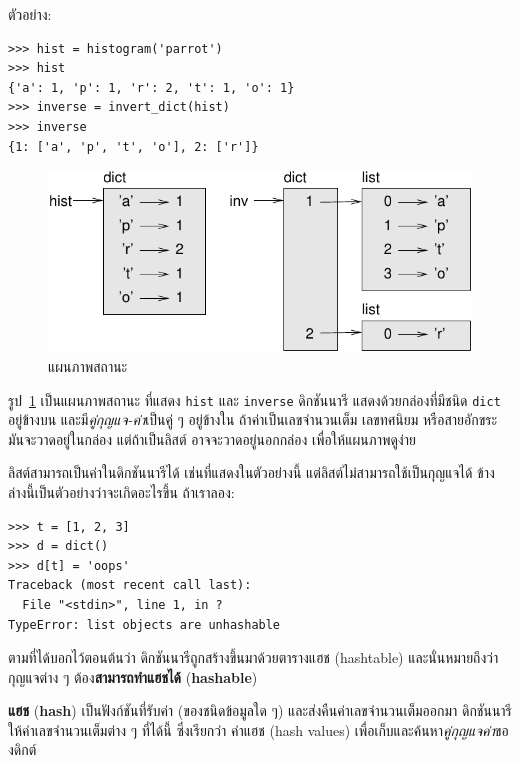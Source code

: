 ตัวอย่าง:

\begin{verbatim}
>>> hist = histogram('parrot')
>>> hist
{'a': 1, 'p': 1, 'r': 2, 't': 1, 'o': 1}
>>> inverse = invert_dict(hist)
>>> inverse
{1: ['a', 'p', 't', 'o'], 2: ['r']}
\end{verbatim}

\begin{figure}
\centerline
{\includegraphics[scale=0.8]{figs/dict1.pdf}}
\caption{แผนภาพสถานะ}
\label{fig.dict1}
\end{figure}

รูป~\ref{fig.dict1} เป็นแผนภาพสถานะ ที่แสดง \texttt{hist} และ \texttt{inverse}
%
ดิกชันนารี แสดงด้วยกล่องที่มีชนิด \texttt{dict} อยู่ข้างบน
และมี\textit{คู่กุญแจ-ค่า}เป็นคู่ ๆ อยู่ข้างใน
ถ้าค่าเป็นเลขจำนวนเต็ม เลขทศนิยม หรือสายอักขระ มันจะวาดอยู่ในกล่อง
แต่ถ้าเป็นลิสต์ อาจจะวาดอยู่นอกกล่อง เพื่อให้แผนภาพดูง่าย

ลิสต์สามารถเป็นค่าในดิกชันนารีได้ เช่นที่แสดงในตัวอย่างนี้
แต่ลิสต์ไม่สามารถใช้เป็นกุญแจได้
ข้างล่างนี้เป็นตัวอย่างว่าจะเกิดอะไรขึ้น ถ้าเราลอง:

\begin{verbatim}
>>> t = [1, 2, 3]
>>> d = dict()
>>> d[t] = 'oops'
Traceback (most recent call last):
  File "<stdin>", line 1, in ?
TypeError: list objects are unhashable
\end{verbatim}
%
ตามที่ได้บอกไว้ตอนต้นว่า ดิกชันนารีถูกสร้างขึ้นมาด้วยตารางแฮช (hashtable)
และนั่นหมายถึงว่า กุญแจต่าง ๆ ต้อง\textbf{สามารถทำแฮชได้} (\textbf{hashable})

\textbf{แฮช} (\textbf{hash}) เป็นฟังก์ชันที่รับค่า (ของชนิดข้อมูลใด ๆ) และส่งคืนค่าเลขจำนวนเต็มออกมา
ดิกชันนารีให้ค่าเลขจำนวนเต็มต่าง ๆ ที่ได้นี้ ซึ่งเรียกว่า ค่าแฮช (hash values)
เพื่อเก็บและค้นหา\textit{คู่กุญแจค่า}ของดิกต์

